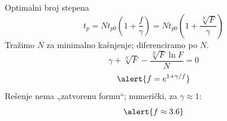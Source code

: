 \begin{frame}[label=09_3-s020]{Optimalni broj stepena}
\[t_p=Nt_{p0}\left(1+\frac f\gamma\right)
=Nt_{p0}\left(1+\frac{\sqrt[N]F}\gamma\right)\]
\alert{Tražimo $N$} za minimalno kašnjenje; diferenciramo po $N$.
\[\gamma+\sqrt[N]F-\frac{\sqrt[N]F\ln F}N=0\]
\[\alert{f=e^{1+\gamma/f}}\]
Rešenje nema „zatvorenu formu“; numerički, za $\gamma\approx1$:
\[\alert{f\approx3.6}\]
\end{frame}
